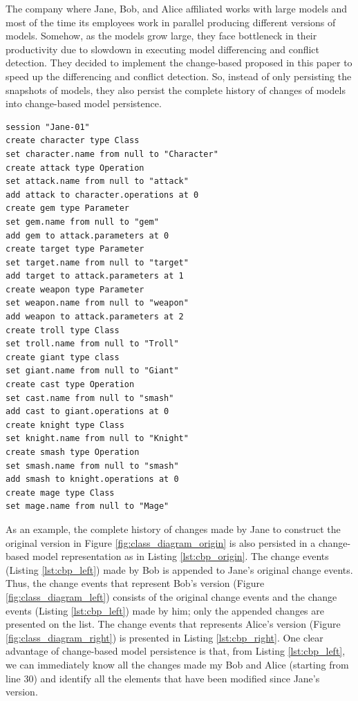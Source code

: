 The company where Jane, Bob, and Alice affiliated works with large models and most of the time its employees work in parallel producing different versions of models. Somehow, as the models grow large, they face bottleneck in their productivity due to slowdown in executing model differencing and conflict detection. They decided to implement the change-based proposed in this paper to speed up the differencing and conflict detection. So, instead of only persisting the snapshots of models, they also persist the complete history of changes of models into change-based model persistence. 

\vspace{-20pt}
\begin{lstlisting}[style=eol,caption={Change-based representation of the original version in Figure \ref{fig:class_diagram_origin}.},label=lst:cbp_origin]
session "Jane-01"
create character type Class
set character.name from null to "Character" 
create attack type Operation
set attack.name from null to "attack" 
add attack to character.operations at 0
create gem type Parameter
set gem.name from null to "gem" 
add gem to attack.parameters at 0
create target type Parameter
set target.name from null to "target" 
add target to attack.parameters at 1
create weapon type Parameter
set weapon.name from null to "weapon" 
add weapon to attack.parameters at 2
create troll type Class
set troll.name from null to "Troll" 
create giant type class
set giant.name from null to "Giant"
create cast type Operation
set cast.name from null to "smash"
add cast to giant.operations at 0
create knight type Class
set knight.name from null to "Knight"
create smash type Operation
set smash.name from null to "smash"
add smash to knight.operations at 0
create mage type Class
set mage.name from null to "Mage" 
\end{lstlisting}

As an example, the complete history of changes made by Jane to construct the original version in Figure \ref{fig:class_diagram_origin} is also persisted in a change-based model representation as in Listing \ref{lst:cbp_origin}. The change events (Listing \ref{lst:cbp_left}) made by Bob is appended to Jane's original change events. Thus, the change events that represent Bob's version (Figure \ref{fig:class_diagram_left}) consists of the original change events and the change events (Listing \ref{lst:cbp_left}) made by him; only the appended changes are presented on the list. The change events that represents Alice's version (Figure \ref{fig:class_diagram_right}) is presented in Listing \ref{lst:cbp_right}. One clear advantage of change-based model persistence is that, from Listing \ref{lst:cbp_left}, we can immediately know all the changes made my Bob and Alice (starting from line 30) and identify all the elements that have been modified since Jane's version.  

